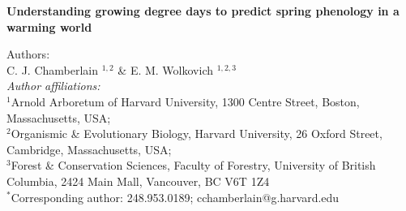 \documentclass{article}\usepackage[]{graphicx}\usepackage[]{color}
\begin{document}
\noindent\textbf{\Large{Understanding growing degree days to predict spring phenology in a warming world}}

\noindent Authors:\\
C. J. Chamberlain $^{1,2}$ \& E. M. Wolkovich $^{1,2,3}$
\vspace{2ex}\\
\emph{Author affiliations:}\\
$^{1}$Arnold Arboretum of Harvard University, 1300 Centre Street, Boston, Massachusetts, USA; \\
$^{2}$Organismic \& Evolutionary Biology, Harvard University, 26 Oxford Street, Cambridge, Massachusetts, USA; \\
$^{3}$Forest \& Conservation Sciences, Faculty of Forestry, University of British Columbia, 2424 Main Mall, Vancouver, BC V6T 1Z4\\
\vspace{2ex}
$^*$Corresponding author: 248.953.0189; cchamberlain@g.harvard.edu\\

\renewcommand{\thetable}{\arabic{table}}
\renewcommand{\thefigure}{\arabic{figure}}
\renewcommand{\labelitemi}{$-$}

\end{document}
